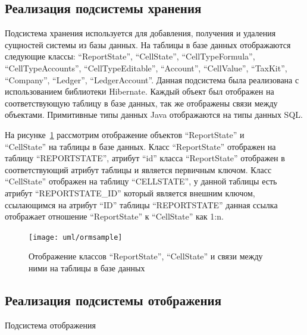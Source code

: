\documentclass[14pt,a4paper]{reportmod}
\begin{document}
\subsection{Реализация подсистемы хранения}

Подсистема хранения используется для добавления, получения и удаления сущностей системы из базы данных. На таблицы в базе данных отображаются следующие классы: ``ReportState'', ``CellState'', ``CellTypeFormula'',\\``CellTypeAccounts'', ``CellTypeEditable'', ``Account'', ``CellValue'', ``TaxKit'',\\``Company'', ``Ledger'', ``LedgerAccount''. Данная подсистема была реализована с использованием библиотеки Hibernate. Каждый объект был отображен на соответствующую таблицу в базе данных, так же отображены связи между объектами. Примитивные типы данных Java отображаются на типы данных SQL.

На рисунке~\ref{pic:ormsample} рассмотрим отображение объектов ``ReportState'' и\\ ``CellState'' на таблицы в базе данных. Класс ``ReportState'' отображен на таблицу ``REPORTSTATE'', атрибут ``id'' класса ``ReportState'' отображен в соответствующий атрибут таблицы и является первичным ключом. Класс ``CellState'' отображен на таблицу ``CELLSTATE'', у данной таблицы есть атрибут ``REPORTSTATE\_ID'' который является внешним ключом, ссылающимся на атрибут ``ID'' таблицы ``REPORTSTATE'' данная ссылка отображает отношение ``ReportState'' к ``CellState'' как 1:n.

\begin{figure}
  \centering
  \texttt{[image: uml/ormsample]}
  \caption{Отображение классов ``ReportState'', ``CellState'' и связи между ними на таблицы в базе данных}
  \label{pic:ormsample}
\end{figure}


\subsection{Реализация подсистемы отображения}
Подсистема отображения
\end{document}
